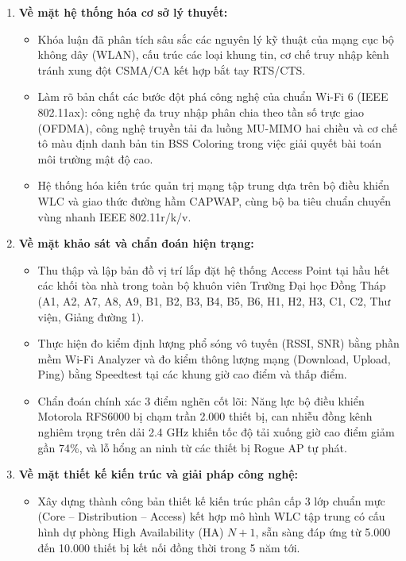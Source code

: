 \begin{enumerate}
    \item \textbf{Về mặt hệ thống hóa cơ sở lý thuyết:}
      \begin{itemize}
        \item Khóa luận đã phân tích sâu sắc các nguyên lý kỹ thuật của mạng cục bộ không dây (WLAN), cấu trúc các loại khung tin, cơ chế truy nhập kênh tránh xung đột CSMA/CA kết hợp bắt tay RTS/CTS.
        \item Làm rõ bản chất các bước đột phá công nghệ của chuẩn Wi-Fi 6 (IEEE 802.11ax): công nghệ đa truy nhập phân chia theo tần số trực giao (OFDMA), công nghệ truyền tải đa luồng MU-MIMO hai chiều và cơ chế tô màu định danh bản tin BSS Coloring trong việc giải quyết bài toán môi trường mật độ cao.
        \item Hệ thống hóa kiến trúc quản trị mạng tập trung dựa trên bộ điều khiển WLC và giao thức đường hầm CAPWAP, cùng bộ ba tiêu chuẩn chuyển vùng nhanh IEEE 802.11r/k/v.
      \end{itemize}
    \item \textbf{Về mặt khảo sát và chẩn đoán hiện trạng:}
      \begin{itemize}
        \item Thu thập và lập bản đồ vị trí lắp đặt hệ thống Access Point tại hầu hết các khối tòa nhà trong toàn bộ khuôn viên Trường Đại học Đồng Tháp (A1, A2, A7, A8, A9, B1, B2, B3, B4, B5, B6, H1, H2, H3, C1, C2, Thư viện, Giảng đường 1).
        \item Thực hiện đo kiểm định lượng phổ sóng vô tuyến (RSSI, SNR) bằng phần mềm Wi-Fi Analyzer và đo kiểm thông lượng mạng (Download, Upload, Ping) bằng Speedtest tại các khung giờ cao điểm và thấp điểm.
        \item Chẩn đoán chính xác 3 điểm nghẽn cốt lõi: Năng lực bộ điều khiển Motorola RFS6000 bị chạm trần 2.000 thiết bị, can nhiễu đồng kênh nghiêm trọng trên dải 2.4 GHz khiến tốc độ tải xuống giờ cao điểm giảm gần 74\%, và lỗ hổng an ninh từ các thiết bị Rogue AP tự phát.
      \end{itemize}
    \item \textbf{Về mặt thiết kế kiến trúc và giải pháp công nghệ:}
      \begin{itemize}
        \item Xây dựng thành công bản thiết kế kiến trúc phân cấp 3 lớp chuẩn mực (Core -- Distribution -- Access) kết hợp mô hình WLC tập trung có cấu hình dự phòng High Availability (HA) $N+1$, sẵn sàng đáp ứng từ 5.000 đến 10.000 thiết bị kết nối đồng thời trong 5 năm tới.

\end{itemize}
\end{enumerate}
